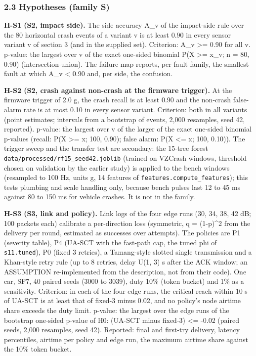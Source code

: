 \subsubsection*{2.3 Hypotheses (family S)}

\textbf{H-S1 (S2, impact side).} The side accuracy A\_v of the impact-side rule over the 80 horizontal crash events of a variant v is at least 0.90 in every sensor variant v of section 3 (and in the supplied set). Criterion: A\_v >= 0.90 for all v. p-value: the largest over v of the exact one-sided binomial P(X >= x\_v; n = 80, 0.90) (intersection-union). The failure map reports, per fault family, the smallest fault at which A\_v < 0.90 and, per side, the confusion.

\textbf{H-S2 (S2, crash against non-crash at the firmware trigger).} At the firmware trigger of 2.0 g, the crash recall is at least 0.90 and the non-crash false-alarm rate is at most 0.10 in every sensor variant. Criterion: both in all variants (point estimates; intervals from a bootstrap of events, 2,000 resamples, seed 42, reported). p-value: the largest over v of the larger of the exact one-sided binomial p-values (recall: P(X >= x; 100, 0.90); false alarm: P(X <= x; 100, 0.10)). The trigger sweep and the transfer test are secondary: the 15-tree forest \texttt{data/processed/rf15\_seed42.joblib} (trained on VZCrash windows, threshold chosen on validation by the earlier study) is applied to the bench windows (resampled to 100 Hz, units g, 14 features of \texttt{features.compute\_features}); this tests plumbing and scale handling only, because bench pulses last 12 to 45 ms against 80 to 150 ms for vehicle crashes. It is not in the family.

\textbf{H-S3 (S3, link and policy).} Link logs of the four edge runs (30, 34, 38, 42 dB; 100 packets each) calibrate a per-direction loss (symmetric, q = (1-p)\textasciicircum{}2 from the delivery per round, estimated as successes over attempts). The policies are P1 (severity table), P4 (UA-SCT with the fast-path cap, the tuned phi of \texttt{s11.tuned}), P0 (fixed 3 retries), a Tamang-style slotted single transmission and a Khan-style retry rule (up to 8 retries, delay U(1, 3) s after the ACK window; an ASSUMPTION re-implemented from the description, not from their code). One car, SF7, 40 paired seeds (3000 to 3039), duty 10\% (token bucket) and 1\% as a sensitivity. Criterion: in each of the four edge runs, the critical reach within 10 s of UA-SCT is at least that of fixed-3 minus 0.02, and no policy's node airtime share exceeds the duty limit. p-value: the largest over the edge runs of the bootstrap one-sided p-value of H0: (UA-SCT minus fixed-3) <= -0.02 (paired seeds, 2,000 resamples, seed 42). Reported: final and first-try delivery, latency percentiles, airtime per policy and edge run, the maximum airtime share against the 10\% token bucket.

